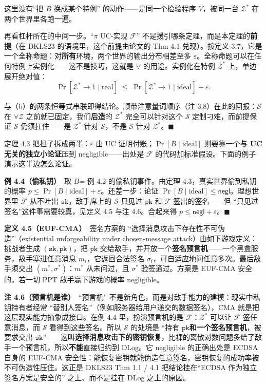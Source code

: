 这里没有“把 $B$ 换成某个特例”
的动作------是同一个检验程序 $V$，被同一台 $\mathcal{Z}^*$ 在两个世界里各跑一遍。

再看杠杆所在的中间一步。“$\pi$ UC-实现 $\mathcal{F}$”
不是援引哪条定理，而是本定理的\textbf{前提}（在 DKLS23
的语境里，这个前提由论文的 Thm 4.1 兑现）。按定义
3.7，它是一个全称命题：对\textbf{所有}环境，两个世界的输出分布相差至多 $\varepsilon$。全称命题可以在任何特例上实例化------这不是技巧，这就是 $\forall$ 的用途。实例化在特例 $\mathcal{Z}^*$ 上，单边展开绝对值：
\begin{equation}\label{eq:uc-framework:6}
\Pr[\mathcal{Z}^*\to 1 \mid \text{real}] \;\le\; \Pr[\mathcal{Z}^*\to 1 \mid \text{ideal}] + \varepsilon.
\end{equation}

与（b）的两条恒等式串联即得结论。顺带注意量词顺序（注
3.8）在此的回报：$\mathcal{S}$ 在 $\forall \mathcal{Z}$ 之前就已固定，我们\textbf{后造}的 $\mathcal{Z}^*$ 完全可以针对这个 $\mathcal{S}$ 定制刁难，而前提保证 $\mathcal{S}$ 仍须扛住------是 $\mathcal{Z}^*$ 针对 $\mathcal{S}$，不是 $\mathcal{S}$ 针对 $\mathcal{Z}^*$。$\blacksquare$

定理 4.3 把担子拆成两半：$\varepsilon$ 由 UC
证明付账；$\Pr[B \mid \text{ideal}]$ 则要靠一个\textbf{与 UC
无关的独立小论证}压到
negligible------出处是 $\mathcal{F}$ 的代码加标准假设。下面的例子演示这半边怎么论证。

\textbf{例 4.4（偷私钥）}　取 $B$= 例 4.2 的偷私钥事件。由定理
4.3，真实世界偷到私钥的概率 $p \le \Pr[B \mid \text{ideal}] + \varepsilon$。还差一步：论证 $\Pr[B \mid \text{ideal}] \le \mathsf{negl}$。理想世界里 $\mathcal{F}$ 从不吐出 $\mathtt{sk}$，敌手席上的 $\mathcal{S}$ 只见过 $\mathtt{pk}$ 和 $\mathcal{F}$ 签出的签名------但
“只见过签名”这件事需要较真，见定义 4.5 与注
4.6。合起来得 $p \le \mathsf{negl} + \varepsilon$。$\blacksquare$

\textbf{定义 4.5（EUF-CMA）}　签名方案的
“选择消息攻击下存在性不可伪造”（existential unforgeability under
chosen-message
attack）由如下游戏定义：挑战者生成 $(\mathtt{sk}, \mathtt{pk})$，把 $\mathtt{pk}$ 交给敌手，并开放一个\textbf{签名预言机}------一个黑盒服务，敌手塞进任意消息 $m_i$，它返回合法签名 $\sigma_i$，可自适应地问任意多次。最后敌手须交出 $(m^*, \sigma^*)$：$m^*$ 从未问过，且 $\sigma^*$ 验签通过。方案是
EUF-CMA 安全的，若一切 PPT 敌手赢下游戏的概率 negligible。

\textbf{注 4.6（预言机是谁）}　“预言机”
不是新角色，而是对敌手能力的建模：现实中私钥持有者经常
“替别人签名”（例如服务器给用户递交的数据签名），CMA
就是把这层现实能力抽象成接口。在例 4.4
里，扮演预言机的是 $\mathcal{F}$：$\mathcal{Z}^*$ 可以让 $\mathcal{F}$ 签任意消息，而 $\mathcal{S}$ 看得到这些签名。所以 $\mathcal{S}$ 的处境是
“持有 $\mathtt{pk}$\textbf{和一个签名预言机}，被要求交出 $\mathtt{sk}$”------这叫\textbf{选择消息攻击下的密钥恢复}，比裸的离散对数问题多给了敌手一个预言机，所以\textbf{不能}直接归约到
DLog。它 negligible 的正确出处是 ECDSA 自身的 EUF-CMA
安全性：能恢复密钥就能伪造任意签名，密钥恢复的成功率被不可伪造性压住。这正是
DKLS23 Thm 1.1 / 4.1 把结论挂在“ECDSA 作为独立签名方案是安全的”
之上、而不是挂在 DLog 之上的原因。

